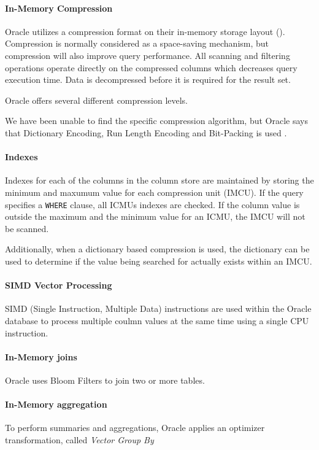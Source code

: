 \paragraph{In-Memory Compression}
\label{par:In-Memory Compression}
Oracle utilizes a compression format on their in-memory storage layout (\cite{Oracle2015-fs}). Compression is normally considered as a space-saving mechanism, but compression will also improve query performance. All scanning and filtering operations operate directly on the compressed columns which decreases query execution time. Data is decompressed before it is required for the result set.

Oracle offers several different compression levels.

We have been unable to find the specific compression algorithm, but Oracle says that Dictionary Encoding, Run Length Encoding and Bit-Packing is used \cite{Oracle2015-fs}.

\paragraph{Indexes}
\label{par:Indexes}
Indexes for each of the columns in the column store are maintained by storing the minimum and maxumum value for each compression unit (IMCU). If the query specifies a \texttt{WHERE} clause, all ICMUs indexes are checked. If the column value is outside the maximum and the minimum value for an ICMU, the IMCU will not be scanned.

Additionally, when a dictionary based compression is used, the dictionary can be used to determine if the value being searched for actually exists within an IMCU.

\paragraph{SIMD Vector Processing}
\label{par:SIMD Vector Processing}
SIMD (Single Instruction, Multiple Data) instructions are used within the Oracle database to process multiple coulmn values at the same time using a single CPU instruction. 

\paragraph{In-Memory joins}
\label{par:In-Memory joins}
Oracle uses Bloom Filters to join two or more tables.

\paragraph{In-Memory aggregation}
\label{par:In-Memory aggregation}
To perform summaries and aggregations, Oracle applies an optimizer transformation, called \textit{Vector Group By}

